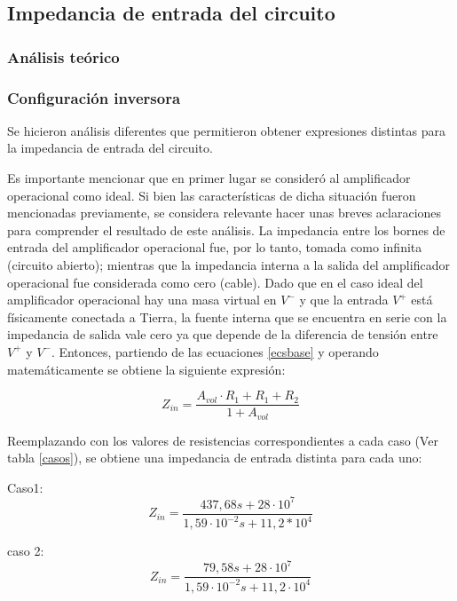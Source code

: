 \subsection{Impedancia de entrada del circuito} %


\subsubsection{An\'alisis te\'orico} %

\subsubsection*{Configuraci\'on inversora}
Se hicieron an\'alisis diferentes que permitieron obtener expresiones distintas para la impedancia de entrada del circuito.

Es importante mencionar que en primer lugar se consider\'o al amplificador operacional como ideal. Si bien las caracter\'isticas de dicha situaci\'on fueron mencionadas previamente, se considera relevante hacer unas breves aclaraciones para comprender el resultado de este an\'alisis. La impedancia entre los bornes de entrada del amplificador operacional fue, por lo tanto, tomada como infinita (circuito abierto); mientras que la impedancia interna a la salida del amplificador operacional fue considerada como cero (cable). Dado que en el caso ideal del amplificador operacional hay una masa virtual en $V^-$ y que la entrada $V^+$ est\'a f\'isicamente conectada a Tierra, la fuente interna que se encuentra en serie con la impedancia de salida vale cero ya que depende de la diferencia de tensi\'on entre $V^+$ y $V^-$. Entonces, partiendo de las ecuaciones \ref{ecsbase} y operando matem\'aticamente se obtiene la siguiente expresi\'on:

\begin{equation}
	Z_{in} =  \frac{A_{vol} \cdot R_1 + R_1 + R_2}{1 + A_{vol}}
	\label{zint}
\end{equation}

Reemplazando con los valores de resistencias correspondientes a cada caso (Ver tabla \ref{casos}), se obtiene una impedancia de entrada distinta para cada uno:

Caso1:
\begin{equation}
	Z_{in} =  \frac{437,68 s + 28 \cdot 10^7}{1,59 \cdot 10^{-2} s + 11,2 * 10^4}
	\label{c1c1zint}
\end{equation}

caso 2:
\begin{equation}
	Z_{in} =  \frac{79,58 s + 28 \cdot 10^7}{1,59 \cdot 10^{-2} s + 11,2 \cdot 10^4}
	\label{c1c2zint}
\end{equation}

